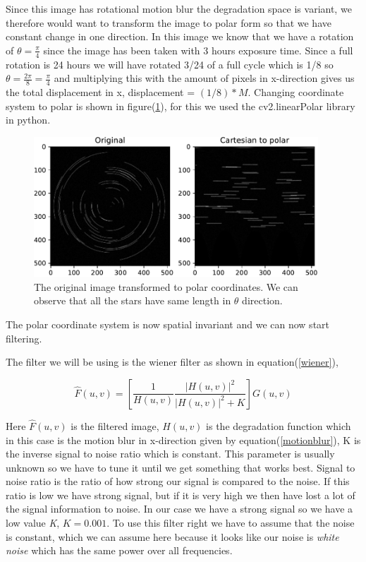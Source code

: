 {Since this image has rotational motion blur the degradation space is variant, we therefore would want to transform the image to polar form so that we have constant change in one direction. In this image we know that we have a rotation of $\theta = \frac{\pi}{4}$ since the image has been taken with 3 hours exposure time. Since a full rotation is 24 hours we will have rotated 3/24 of a full cycle which is 1/8 so $\theta = \frac{2\pi}{8} = \frac{\pi}{4}$ and multiplying this with the amount of pixels in x-direction gives us the total displacement in x, displacement = $(1/8)*M$. Changing coordinate system to polar is shown in figure(\ref{changingsystem}), for this we used the cv2.linearPolar library in python.


\begin{figure}[!htb]
    {\centering
        \includegraphics[width=0.95\textwidth]{carttopol.pdf}
        \caption{The original image transformed to polar coordinates. We can observe that all the stars have same length in $\theta$ direction.}
        \label{changingsystem}
    \par}
    \end{figure}
The polar coordinate system is now spatial invariant and we can now start filtering.

The filter we will be using is the wiener filter as shown in equation(\ref{wiener}),

\begin{equation}
    \hat{F}(u,v) = \left[\frac{1}{H(u,v)}\frac{|H(u,v)|^{2}}{|H(u,v)|^{2} + K}\right]G(u,v)
    \label{wiener}
\end{equation}

Here $\hat{F}(u,v)$ is the filtered image, $H(u,v)$ is the degradation function which in this case is the motion blur in x-direction given by equation(\ref{motionblur}), K is the inverse signal to noise ratio which is constant. This parameter is usually unknown so we have to tune it until we get something that works best. Signal to noise ratio is the ratio of how strong our signal is compared to the noise. If this ratio is low we have strong signal, but if it is very high we then have lost a lot of the signal information to noise. In our case we have a strong signal so we have a low value \emph{K}, $K = 0.001$. To use this filter right we have to assume that the noise is constant, which we can assume here because it looks like our noise is \emph{white noise} which has the same power over all frequencies.

}
